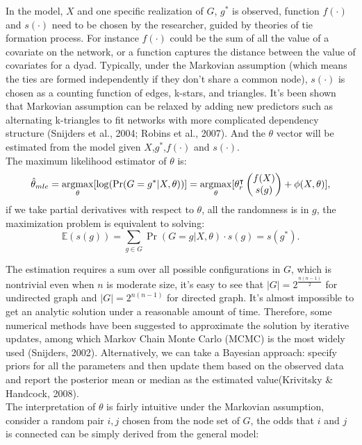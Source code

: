 \documentclass[11pt]{article}
\newcommand{\argmax}{\operatornamewithlimits{argmax}}
\begin{document}
In the model, $X$ and one specific realization of $G$, $g^*$ is observed, function $f(\cdot)$ and $s(\cdot)$ need to be chosen by the researcher, guided by theories of tie formation process. For instance $f(\cdot)$ could be the sum of all the value of a covariate on the network, or a function captures the distance between the value of covariates for a dyad. Typically, under the Markovian assumption (which means the ties are formed independently if they don't share a common node), $s(\cdot)$ is chosen as a counting function of edges, k-stars, and triangles. It's been shown that Markovian assumption can be relaxed by adding new predictors such as alternating k-triangles to fit networks with more complicated dependency structure (Snijders et al., 2004; Robins et al., 2007). And the $\theta$ vector will be estimated from the model given $X$,$g^*$,$f(\cdot)$ and $s(\cdot)$.\\

The maximum likelihood estimator of $\theta$ is:
$${\hat{\theta}}_{mle} = \argmax_\theta [\log(\Pr(G=g^*|X,\theta))]=\argmax_\theta[\theta_r^\intercal 
\begin{pmatrix} f(X)\\s(g) \end{pmatrix} + \phi(X,\theta)],$$
if we take partial derivatives with respect to $\theta$, all the randomness is in $g$, the maximization problem is equivalent to solving:
$$\mathbb{E}(s(g))=\sum_{g \in G}  \Pr(G=g|X,\theta)\cdot s(g) = s(g^*).$$

The estimation requires a sum over all possible configurations in $G$, which is nontrivial even when $n$ is moderate size, it's easy to see that $|G|=2^{\frac{n(n-1)}{2}}$ for undirected graph and $|G|=2^{n(n-1)}$ for directed graph. It's almost impossible to get an analytic solution under a reasonable amount of time. Therefore, some numerical methods have been suggested to approximate the solution by iterative updates, among which Markov Chain Monte Carlo (MCMC) is the most widely used (Snijders, 2002). Alternatively, we can take a Bayesian approach: specify priors for all the parameters and then update them based on the observed data and report the posterior mean or median as the estimated value(Krivitsky \& Handcock, 2008).\\

The interpretation of $\theta$ is fairly intuitive under the Markovian assumption, consider a random pair $i, j$ chosen from the node set of $G$, the odds that $i$ and $j$ is connected can be simply derived from the general model:
\end{document}
